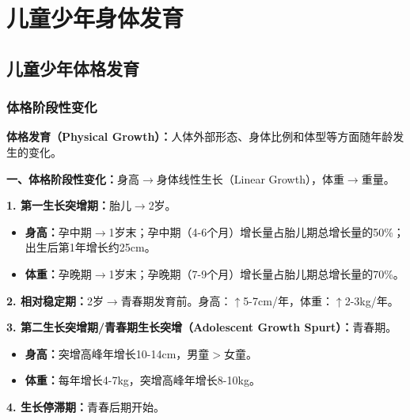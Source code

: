 \chapter{儿童少年身体发育}
\setcounter{chapter}{5}

\section{儿童少年体格发育}

\subsection{体格阶段性变化}

\begin{keybox}
\textbf{体格发育（Physical Growth）：}人体外部形态、身体比例和体型等方面随年龄发生的变化。

\textbf{一、体格阶段性变化：}身高$\to$身体线性生长（Linear Growth），体重$\to$重量。

\textbf{1. 第一生长突增期：}胎儿$\to$2岁。
\begin{itemize}[leftmargin=*]
    \item \textbf{身高：}孕中期$\to$1岁末；孕中期（4-6个月）增长量占胎儿期总增长量的50\%；出生后第1年增长约25cm。
    \item \textbf{体重：}孕晚期$\to$1岁末；孕晚期（7-9个月）增长量占胎儿期总增长量的70\%。
\end{itemize}

\textbf{2. 相对稳定期：}2岁$\to$青春期发育前。身高：$\uparrow$5-7cm/年，体重：$\uparrow$2-3kg/年。

\textbf{3. 第二生长突增期/青春期生长突增（Adolescent Growth Spurt）：}青春期。
\begin{itemize}[leftmargin=*]
    \item \textbf{身高：}突增高峰年增长10-14cm，男童$>$女童。
    \item \textbf{体重：}每年增长4-7kg，突增高峰年增长8-10kg。
\end{itemize}

\textbf{4. 生长停滞期：}青春后期开始。
\end{keybox}

